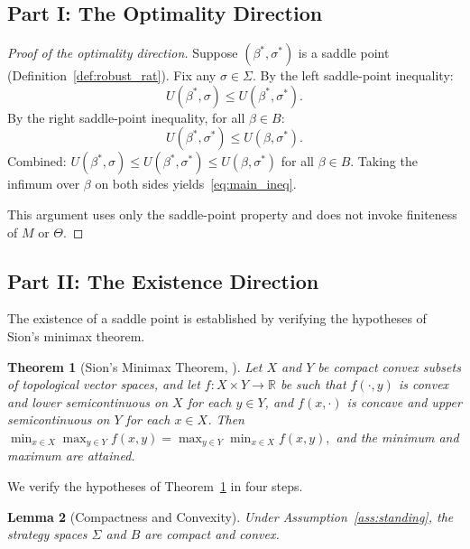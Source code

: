 \documentclass[11pt,a4paper]{article}
\newtheorem{theorem}{Theorem}[section]
\newtheorem{lemma}[theorem]{Lemma}
\theoremstyle{definition}
\newcommand{\R}{\mathbb{R}}
\begin{document}
\subsection{Part I: The Optimality Direction}
\label{sec:optimality}

\begin{proof}[Proof of the optimality direction]
Suppose $(\beta^*,\sigma^*)$ is a saddle point (Definition~\ref{def:robust_rat}).
Fix any $\sigma\in\Sigma$.
By the left saddle-point inequality:
\begin{equation}
U(\beta^*,\sigma) \le U(\beta^*,\sigma^*).
\end{equation}
By the right saddle-point inequality, for all $\beta\in B$:
\begin{equation}
U(\beta^*,\sigma^*) \le U(\beta,\sigma^*).
\end{equation}
Combined:
$U(\beta^*,\sigma) \le U(\beta^*,\sigma^*) \le U(\beta,\sigma^*)$ for all $\beta\in B$.
Taking the infimum over $\beta$ on both sides yields~\eqref{eq:main_ineq}.

This argument uses only the saddle-point property and does not invoke finiteness of $M$ or $\Theta$.
\end{proof}

\subsection{Part II: The Existence Direction}
\label{sec:existence}

The existence of a saddle point is established by verifying the hypotheses of Sion's minimax theorem.

\begin{theorem}[Sion's Minimax Theorem, {\citealt{sion1958general}}]
\label{thm:sion}
Let $X$ and $Y$ be compact convex subsets of topological vector spaces, and let $f:X\times Y\to\R$ be such that $f(\cdot,y)$ is convex and lower semicontinuous on $X$ for each $y\in Y$, and $f(x,\cdot)$ is concave and upper semicontinuous on $Y$ for each $x\in X$.
Then
$\min_{x\in X}\max_{y\in Y} f(x,y) = \max_{y\in Y}\min_{x\in X} f(x,y),$
and the minimum and maximum are attained.
\end{theorem}

We verify the hypotheses of Theorem~\ref{thm:sion} in four steps.

\begin{lemma}[Compactness and Convexity]
\label{lem:compact_convex}
Under Assumption~\ref{ass:standing}, the strategy spaces $\Sigma$ and $B$ are compact and convex.
\end{lemma}
\end{document}
